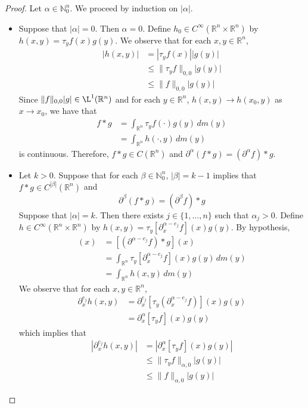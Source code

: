 \documentclass{book}
\theoremstyle{definition}
\newcommand{\al}{\alpha}
\newcommand{\be}{\beta}
\newcommand{\N}{\mathbb{N}}
\newcommand{\R}{\mathbb{R}}
\DeclareMathOperator*{\0}{\mbf{0}}
\DeclareMathOperator*{\1}{\mbf{1}}
\newcommand{\p}{\partial}
\newcommand{\dm}{\, d m}
\begin{document}
	\begin{proof}
			Let $\al \in \N_0^n$. We proceed by induction on $|\al|$.
			\begin{itemize}
				\item Suppose that $|\al| = 0$. Then $\al = 0$. Define $h_0 \in C^{\infty}(\R^n \times \R^n)$ by $h(x,y) = \tau_y  f(x)g(y)$. We observe that for each $x,y \in \R^n$, 
				\begin{align*}
					|h(x,y)| 
					& = |\tau_y f(x)||g(y)| \\
					& \leq \|\tau_y f\|_{0, 0} |g(y)| \\
					& \leq \|f\|_{0,0} |g(y)|
				\end{align*}
			Since $\|f\|_{0,0} |g| \in \L^1(\R^n)$ and for each $y \in \R^n$, $h(x,y) \rightarrow h(x_0, y)$ as $x \rightarrow x_0$, we have that 
			\begin{align*}
				f*g
				& = \int_{\R^n} \tau_yf (\cdot) g(y) \dm(y) \\
				& = \int_{\R^n} h(\cdot,y) \dm(y) 
			\end{align*}
			is continuous. Therefore, $f*g \in C(\R^n)$ and $\p^{\al}(f*g) = (\p^{\al}f) * g$.
			\item Let $k > 0$. Suppose that for each $\be \in \N_0^n$, $|\be| = k-1$ implies that $f*g \in C^{|\be|}(\R^n)$ and 
			$$\p^{\be}(f*g) = (\p^{\be}f)*g$$ 
			Suppose that $|\al| = k$. Then there exists $j \in \{1, \ldots, n\}$ such that $\al_j > 0$. Define $h \in C^{\infty}(\R^n \times \R^n)$ by $h(x,y) = \tau_y [\p_x^{\al-e_j} f](x)g(y)$. By hypothesis,
			\begin{align*}
				[\p^{\al-e_j} (f*g)](x)
				& = [(\p^{\al-e_j}f) * g](x) \\
				& = \int_{\R^n} \tau_y [\p_x^{\al-e_j} f](x)g(y) \dm(y) \\
				& = \int_{\R^n} h(x,y) \dm(y)
			\end{align*}
			We observe that for each $x,y \in \R^n$, 
			\begin{align*}
				\p_x^{e_j} h(x,y)
				& = \p_x^{e_j} [\tau_y (\p_x^{\al-e_j} f)](x)g(y) \\
				& = \p_x^{\al} [ \tau_y f](x)g(y) 
			\end{align*}
			which implies that
			\begin{align*}
				|\p_x^{e_j} h(x,y)| 
				& = |\p_x^{\al} [ \tau_y f](x)g(y)| \\
				& \leq \|\tau_yf\|_{\al,0}|g(y)| \\
				& \leq \|f\|_{\al,0}|g(y)|
			\end{align*} 

\end{itemize}
\end{proof}
\end{document}
